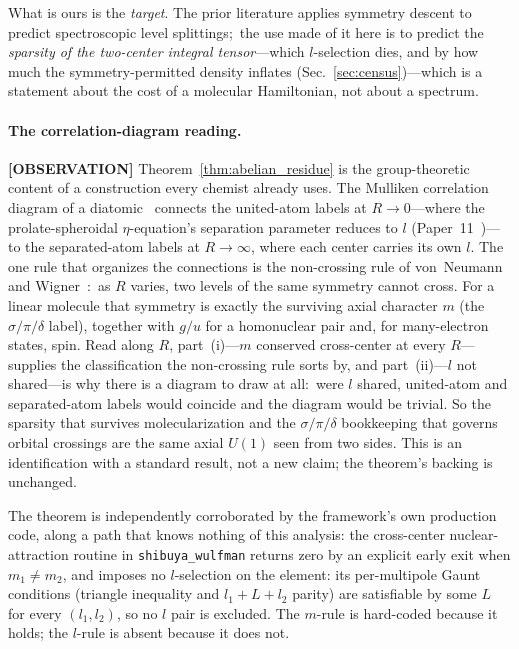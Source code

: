 \documentclass[aps,pra,twocolumn,superscriptaddress,longbibliography]{revtex4-2}
\begin{document}
What is ours is the \emph{target}.  The prior literature applies symmetry
descent to predict spectroscopic level splittings;\ the use made of it here
is to predict the \emph{sparsity of the two-center integral tensor}---which
$l$-selection dies, and by how much the symmetry-permitted density inflates
(Sec.~\ref{sec:census})---which is a statement about the cost of a
molecular Hamiltonian, not about a spectrum.

\paragraph{The correlation-diagram reading.}
\textbf{[OBSERVATION]} Theorem~\ref{thm:abelian_residue} is the
group-theoretic content of a construction every chemist already uses.
The Mulliken correlation diagram of a
diatomic~\cite{mulliken1930,mulliken1932,herzberg1950}
connects the united-atom labels at $R \to 0$---where the
prolate-spheroidal $\eta$-equation's separation parameter reduces to
$l$ (Paper~11~\cite{loutey_paper11})---to the separated-atom labels at
$R \to \infty$, where each center carries its own $l$.  The one rule
that organizes the connections is the non-crossing rule of von~Neumann
and Wigner~\cite{neumann_wigner1929}:\ as $R$ varies, two levels of the
same symmetry cannot cross.  For a linear molecule that symmetry is
exactly the surviving axial character $m$ (the $\sigma/\pi/\delta$
label), together with $g/u$ for a homonuclear pair and, for
many-electron states, spin.  Read along $R$, part~(i)---$m$ conserved
cross-center at every $R$---supplies the classification the non-crossing
rule sorts by, and part~(ii)---$l$ not shared---is why there is a
diagram to draw at all:\ were $l$ shared, united-atom and separated-atom
labels would coincide and the diagram would be trivial.  So the sparsity
that survives molecularization and the $\sigma/\pi/\delta$ bookkeeping
that governs orbital crossings are the same axial $U(1)$ seen from two
sides.  This is an identification with a standard result, not a new
claim; the theorem's backing is unchanged.

The theorem is independently corroborated by the framework's own
production code, along a path that knows nothing of this analysis: the
cross-center nuclear-attraction routine in
\texttt{shibuya\_wulfman} returns
zero by an explicit early exit when $m_1 \neq m_2$, and imposes no
$l$-selection on the element: its per-multipole Gaunt conditions (triangle
inequality and $l_1 + L + l_2$ parity) are satisfiable by some $L$ for
every $(l_1, l_2)$, so no $l$ pair is excluded.  The $m$-rule is hard-coded because it
holds; the $l$-rule is absent because it does not.
\end{document}
